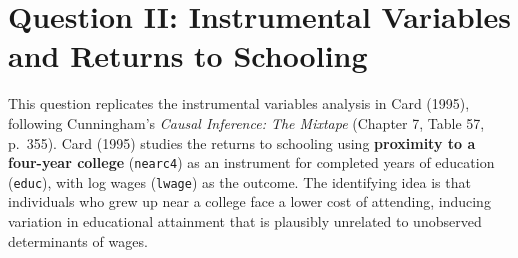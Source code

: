 \documentclass[letterpaper,12pt]{article}
\begin{document}
\section*{Question II: Instrumental Variables and Returns to Schooling}

This question replicates the instrumental variables analysis in Card (1995), following Cunningham's \textit{Causal Inference: The Mixtape} (Chapter 7, Table 57, p.\ 355). Card (1995) studies the returns to schooling using \textbf{proximity to a four-year college} (\texttt{nearc4}) as an instrument for completed years of education (\texttt{educ}), with log wages (\texttt{lwage}) as the outcome. The identifying idea is that individuals who grew up near a college face a lower cost of attending, inducing variation in educational attainment that is plausibly unrelated to unobserved determinants of wages.
\end{document}
